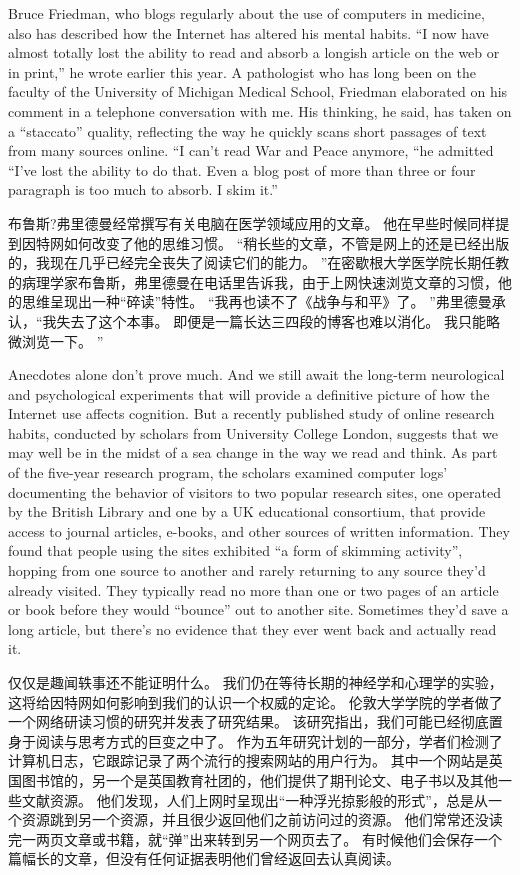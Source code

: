 \documentclass[cs4size, a4paper, 12pt]{article}
\newcounter{numpar}
\newcommand*{\newpar}{\numpar{}}
\begin{document}
	\newpar Bruce Friedman, who blogs regularly about the use of computers in medicine, also has described how the Internet has altered his mental habits. ``I now have almost totally lost the ability to read and absorb a longish article on the web or in print,'' he wrote earlier this year. A pathologist who has long been on the faculty of the University of Michigan Medical School, Friedman elaborated on his comment in a telephone conversation with me. His thinking, he said, has taken on a ``staccato'' quality, reflecting the way he quickly scans short passages of text from many sources online. ``I can't read War and Peace anymore, ``he admitted ``I've lost the ability to do that. Even a blog post of more than three or four paragraph is too much to absorb. I skim it.''
	
	布鲁斯?弗里德曼经常撰写有关电脑在医学领域应用的文章。 他在早些时候同样提到因特网如何改变了他的思维习惯。 ``稍长些的文章，不管是网上的还是已经出版的，我现在几乎已经完全丧失了阅读它们的能力。 ''在密歇根大学医学院长期任教的病理学家布鲁斯，弗里德曼在电话里告诉我，由于上网快速浏览文章的习惯，他的思维呈现出一种``碎读''特性。 ``我再也读不了《战争与和平》了。 ''弗里德曼承认，``我失去了这个本事。 即便是一篇长达三四段的博客也难以消化。 我只能略微浏览一下。 ''
	
	\newpar Anecdotes alone don't prove much. And we still await the long-term neurological and psychological experiments that will provide a definitive picture of how the Internet use affects cognition. But a recently published study of online research habits, conducted by scholars from University College London, suggests that we may well be in the midst of a sea change in the way we read and think. As part of the five-year research program, the scholars examined computer logs' documenting the behavior of visitors to two popular research sites, one operated by the British Library and one by a UK educational consortium, that provide access to journal articles, e-books, and other sources of written information. They found that people using the sites exhibited ``a form of skimming activity'', hopping from one source to another and rarely returning to any source they'd already visited. They typically read no more than one or two pages of an article or book before they would ``bounce'' out to another site. Sometimes they'd save a long article, but there's no evidence that they ever went back and actually read it.         
	
	仅仅是趣闻轶事还不能证明什么。 我们仍在等待长期的神经学和心理学的实验，这将给因特网如何影响到我们的认识一个权威的定论。 伦敦大学学院的学者做了一个网络研读习惯的研究并发表了研究结果。 该研究指出，我们可能已经彻底置身于阅读与思考方式的巨变之中了。 作为五年研究计划的一部分，学者们检测了计算机日志，它跟踪记录了两个流行的搜索网站的用户行为。 其中一个网站是英国图书馆的，另一个是英国教育社团的，他们提供了期刊论文、电子书以及其他一些文献资源。 他们发现，人们上网时呈现出``一种浮光掠影般的形式''，总是从一个资源跳到另一个资源，并且很少返回他们之前访问过的资源。 他们常常还没读完一两页文章或书籍，就``弹''出来转到另一个网页去了。 有时候他们会保存一个篇幅长的文章，但没有任何证据表明他们曾经返回去认真阅读。 
	
\end{document}
